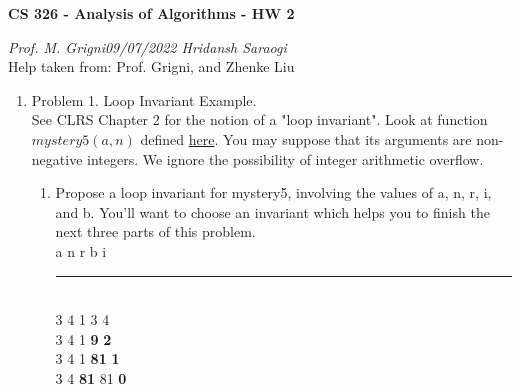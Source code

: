 \documentclass[11pt]{article}
\begin{document}
\begin{center}
    \textbf{CS 326 - Analysis of Algorithms - HW 2}\\
\end{center}


\begin{flushleft}
    \textit{Prof. M. Grigni\hfill09/07/2022 \hfill Hridansh Saraogi} \\
    \vspace{0.15cm}
    \small {Help taken from: Prof. Grigni, and Zhenke Liu}
\end{flushleft}


\begin{enumerate}

\item Problem 1. Loop Invariant Example. \\
See CLRS Chapter 2 for the notion of a "loop invariant". Look at function $mystery5(a,n)$ defined \href{https://cs.emory.edu/~mic/demos/mystery5.html}{here}. You may suppose that its arguments are non-negative integers. We ignore the possibility of integer arithmetic overflow.
    \begin{enumerate}
        \item Propose a loop invariant for mystery5, involving the values of a, n, r, i, and b. You'll want to choose an invariant which helps you to finish the next three parts of this problem.\\
        
        a \hspace{0.5cm} n \hspace{0.5cm} r \hspace{0.5cm} b \hspace{0.5cm} i
        \\\rule{4 cm}{2}\\
        3 \hspace{0.5cm} 4 \hspace{0.5cm} 1 \hspace{0.5cm} 3 \hspace{0.5cm} 4\\
        3 \hspace{0.5cm} 4 \hspace{0.5cm} 1 \hspace{0.5cm} \textbf{9} \hspace{0.5cm} \textbf{2}\\
        3 \hspace{0.5cm} 4 \hspace{0.5cm} 1 \hspace{0.5cm} \textbf{81} \hspace{0.3cm} \textbf{1}\\  
        3 \hspace{0.5cm} 4 \hspace{0.5cm} \textbf{81} \hspace{0.3cm} 81 \hspace{0.3cm} \textbf{0}\\  
        

\end{enumerate}
\end{enumerate}
\end{document}
